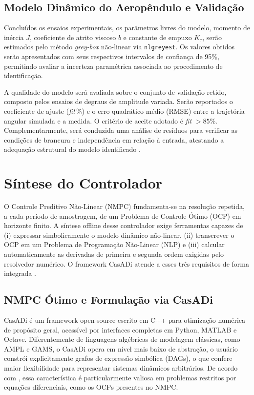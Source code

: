 \subsection{Modelo Dinâmico do Aeropêndulo e Validação}

Concluídos os ensaios experimentais, os parâmetros livres do modelo, momento de inércia $J$, coeficiente de atrito viscoso $b$ e constante de empuxo $K_\tau$, serão estimados pelo método \textit{grey-box} não-linear via \texttt{nlgreyest}. Os valores obtidos serão apresentados com seus respectivos intervalos de confiança de 95\%, permitindo avaliar a incerteza paramétrica associada ao procedimento de identificação.

A qualidade do modelo será avaliada sobre o conjunto de validação retido, composto pelos ensaios de degraus de amplitude variada. Serão reportados o coeficiente de ajuste (\textit{fit}\,\%) e o erro quadrático médio (RMSE) entre a trajetória angular simulada e a medida. O critério de aceite adotado é \textit{fit} $> 85\%$. Complementarmente, será conduzida uma análise de resíduos para verificar as condições de brancura e independência em relação à entrada, atestando a adequação estrutural do modelo identificado \cite{ljung1999}.


\section{Síntese do Controlador}

O Controle Preditivo Não-Linear (NMPC) fundamenta-se na resolução repetida, a cada período de amostragem, de um Problema de Controle Ótimo (OCP) em horizonte finito. A síntese offline desse controlador exige ferramentas capazes de (i) expressar simbolicamente o modelo dinâmico não-linear, (ii) transcrever o OCP em um Problema de Programação Não-Linear (NLP) e (iii) calcular automaticamente as derivadas de primeira e segunda ordem exigidas pelo resolvedor numérico. O framework CasADi atende a esses três requisitos de forma integrada \cite{andersson2019}.

\subsection{NMPC Ótimo e Formulação via CasADi}

CasADi é um framework open-source escrito em C++ para otimização numérica de propósito geral, acessível por interfaces completas em Python, MATLAB e Octave. Diferentemente de linguagens algébricas de modelagem clássicas, como AMPL e GAMS, o CasADi opera em nível mais baixo de abstração, o usuário constrói explicitamente grafos de expressão simbólica (DAGs), o que confere maior flexibilidade para representar sistemas dinâmicos arbitrários. De acordo com , essa característica é particularmente valiosa em problemas restritos por equações diferenciais, como os OCPs presentes no NMPC.


